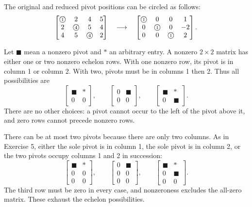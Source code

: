 The original and reduced pivot positions can be circled as follows:
\[
\begin{bmatrix}\text{\textcircled{\scriptsize1}}&2&4&5\\2&\text{\textcircled{\scriptsize4}}&5&4\\4&5&\text{\textcircled{\scriptsize4}}&2\end{bmatrix}
\quad\longrightarrow\quad
\begin{bmatrix}\text{\textcircled{\scriptsize1}}&0&0&1\\0&\text{\textcircled{\scriptsize1}}&0&-2\\0&0&\text{\textcircled{\scriptsize1}}&2\end{bmatrix}.
\]

Let $\blacksquare$ mean a nonzero pivot and $*$ an arbitrary entry.
A nonzero $2\times2$ matrix has either one or two nonzero echelon rows.
With one nonzero row, its pivot is in column 1 or column 2. With two,
pivots must be in columns 1 then 2. Thus all possibilities are
\[
\begin{bmatrix}\blacksquare&*\\0&0\end{bmatrix},\qquad
\begin{bmatrix}0&\blacksquare\\0&0\end{bmatrix},\qquad
\begin{bmatrix}\blacksquare&*\\0&\blacksquare\end{bmatrix}.
\]
There are no other choices: a pivot cannot occur to the left of the pivot
above it, and zero rows cannot precede nonzero rows.

There can be at most two pivots because there are only two columns.
As in Exercise 5, either the sole pivot is in column 1, the sole pivot is
in column 2, or the two pivots occupy columns 1 and 2 in succession:
\[
\begin{bmatrix}\blacksquare&*\\0&0\\0&0\end{bmatrix},\qquad
\begin{bmatrix}0&\blacksquare\\0&0\\0&0\end{bmatrix},\qquad
\begin{bmatrix}\blacksquare&*\\0&\blacksquare\\0&0\end{bmatrix}.
\]
The third row must be zero in every case, and nonzeroness excludes the
all-zero matrix. These exhaust the echelon possibilities.

